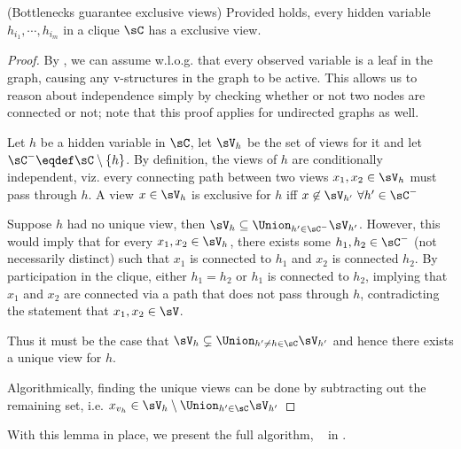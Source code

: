 \begin{lemma}(Bottlenecks guarantee exclusive views)
  Provided  holds, every hidden variable
    $h_{i_1}, \cdots, h_{i_m}$ in a clique $\sC$ has a exclusive view.
\end{lemma}
\begin{proof}
  By , we can assume w.l.o.g. that every observed
  variable is a leaf in the graph, causing any v-structures in the graph
  to be active. This allows us to reason about independence simply by
  checking whether or not two nodes are connected or not; note that this
  proof applies for undirected graphs as well.

  Let $h$ be a hidden variable in $\sC$, let $\sV_{h}$ be the set of
    views for it and let $\sC^- \eqdef \sC \setminus \{h\}$.
  By definition, the views of $h$ are conditionally independent, viz.
    every connecting path between two views $x_1, x_2 \in \sV_h$ must pass through
    $h$.
  A view $x \in \sV_{h}$ is exclusive for $h$ iff $x \not\in \sV_{h'} ~ \forall h'
  \in \sC^-$

  Suppose $h$ had no unique view, then $\sV_{h} \subseteq \Union_{h' \in \sC^-} \sV_{h'}$. 
  However, this would imply that for every $x_1, x_2 \in \sV_{h}$, there
    exists some $h_1, h_2 \in \sC^-$ (not necessarily distinct) such that
    $x_1$ is connected to $h_1$ and $x_2$ is connected $h_2$.
  By participation in the clique, either $h_1 = h_2$ or $h_1$ is
    connected to $h_2$, implying that $x_1$ and $x_2$ are connected
    via a path that does not pass through $h$, contradicting the
    statement that $x_1, x_2 \in \sV$. 
    
  Thus it must be the case that $\sV_{h} \subsetneq \Union_{h' \neq
    h \in \sC} \sV_{h'}$ and hence there exists a unique view for $h$.

  Algorithmically, finding the unique views can be done by subtracting
    out the remaining set, i.e. $x_{v_h} \in \sV_h \setminus \Union_{h'
    \in \sC} \sV_{h'}$
\end{proof}

With this lemma in place, we present the full algorithm, \LearnMarginals~
in .

